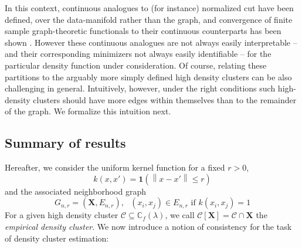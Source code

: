 \documentclass{article}
\newcommand{\norm}[1]{\left\lVert#1\right\rVert}
\newcommand{\1}{\mathbf{1}}
\newcommand{\Xbf}{\mathbf{X}}
\newcommand{\Cbb}{\mathbb{C}}
\newcommand{\Cset}{\mathcal{C}}
\theoremstyle{aldenthm}
\theoremstyle{remark}
\begin{document}
In this context, continuous analogues to (for instance) normalized cut have been defined, over the data-manifold rather than the graph, and convergence of finite sample graph-theoretic functionals to their continuous counterparts has been shown
\cite{garciatrillos16, arias-castro12, maier11}.
However these continuous analogues are not always easily interpretable -- and their corresponding minimizers not always easily identifiable -- for the particular density function under consideration. Of course, relating these partitions to the arguably more simply defined high density clusters can be also challenging in general. Intuitively, however, under the right conditions such high-density clusters should have more edges within themselves than to the remainder of the graph. We formalize this intuition next.




\subsection{Summary of results}

Hereafter, we consider the uniform kernel function for a fixed $r > 0$,
\begin{equation}
k(x,x') = \1(\norm{x - x'} \leq r)
\end{equation}
and the associated neighborhood graph
\begin{equation}
\label{eqn: neighborhood_graph}
G_{n,r} = (\Xbf, E_{n,r}), \text{  $(x_i,x_j) \in E_{n,r}$ if $k(x_i,x_j) = 1$}
\end{equation}
For a given high density cluster $\Cset \subseteq \Cbb_f(\lambda)$, we call $\Cset[\Xbf] = \Cset \cap \Xbf$ the \emph{empirical density cluster}. We now introduce a notion of consistency for the task of density cluster estimation:
\end{document}
